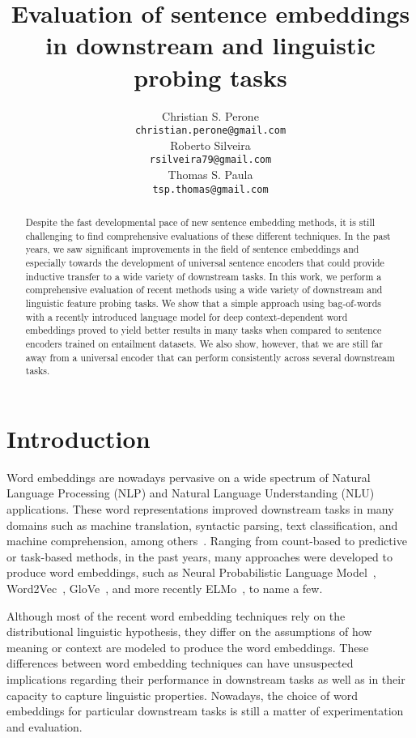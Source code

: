 \documentclass{article}
\title{Evaluation of sentence embeddings in downstream and linguistic probing tasks}
\author{
  Christian S. Perone \\
  \texttt{christian.perone@gmail.com} \\
\And
 Roberto Silveira \\
  \texttt{rsilveira79@gmail.com} \\
\And
Thomas S. Paula \\
  \texttt{tsp.thomas@gmail.com} \\
}
\begin{document}
\maketitle

\begin{abstract}
Despite the fast developmental pace of new sentence embedding methods, it is still challenging to find comprehensive evaluations of these different techniques. In the past years, we saw significant improvements in the field of sentence embeddings and especially towards the development of universal sentence encoders that could provide inductive transfer to a wide variety of downstream tasks. In this work, we perform a comprehensive evaluation of recent methods using a wide variety of downstream and linguistic feature probing tasks. We show that a simple approach using bag-of-words with a recently introduced language model for deep context-dependent word embeddings proved to yield better results in many tasks when compared to sentence encoders trained on entailment datasets. We also show, however, that we are still far away from a universal encoder that can perform consistently across several downstream tasks.
\end{abstract}


\section{Introduction}
Word embeddings are nowadays pervasive on a wide spectrum of Natural Language Processing (NLP) and Natural Language Understanding (NLU) applications. These word representations improved downstream tasks in many domains such as machine translation, syntactic parsing, text classification, and machine comprehension, among others~\cite{Camacho-Collados}. Ranging from count-based to predictive or task-based methods, in the past years, many approaches were developed to produce word embeddings, such as Neural Probabilistic Language Model~\cite{Bengio2003}, Word2Vec~\cite{mikolov2013distributed}, GloVe~\cite{pennington2014glove}, and more recently ELMo~\cite{peters2018deep}, to name a few.

Although most of the recent word embedding techniques rely on the distributional linguistic hypothesis, they differ on the assumptions of how meaning or context are modeled to produce the word embeddings. These differences between word embedding techniques can have unsuspected implications regarding their performance in downstream tasks as well as in their capacity to capture linguistic properties. Nowadays, the choice of word embeddings for particular downstream tasks is still a matter of experimentation and evaluation.
\end{document}
